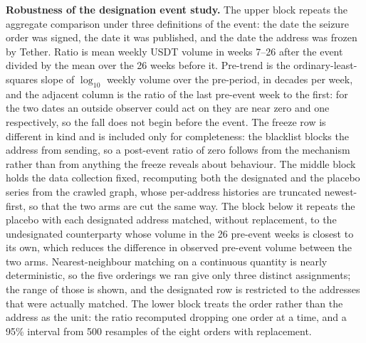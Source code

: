 \caption{\textbf{Robustness of the designation event study.} The upper block repeats the aggregate comparison under three definitions of the event: the date the seizure order was signed, the date it was published, and the date the address was frozen by Tether. Ratio is mean weekly USDT volume in weeks 7--26 after the event divided by the mean over the 26 weeks before it. Pre-trend is the ordinary-least-squares slope of $\log_{10}$ weekly volume over the pre-period, in decades per week, and the adjacent column is the ratio of the last pre-event week to the first: for the two dates an outside observer could act on they are near zero and one respectively, so the fall does not begin before the event. The freeze row is different in kind and is included only for completeness: the blacklist blocks the address from sending, so a post-event ratio of zero follows from the mechanism rather than from anything the freeze reveals about behaviour. The middle block holds the data collection fixed, recomputing both the designated and the placebo series from the crawled graph, whose per-address histories are truncated newest-first, so that the two arms are cut the same way. The block below it repeats the placebo with each designated address matched, without replacement, to the undesignated counterparty whose volume in the 26 pre-event weeks is closest to its own, which reduces the difference in observed pre-event volume between the two arms. Nearest-neighbour matching on a continuous quantity is nearly deterministic, so the five orderings we ran give only three distinct assignments; the range of those is shown, and the designated row is restricted to the addresses that were actually matched. The lower block treats the order rather than the address as the unit: the ratio recomputed dropping one order at a time, and a 95\% interval from 500 resamples of the eight orders with replacement.}
\label{tab:event-robustness}
\small
